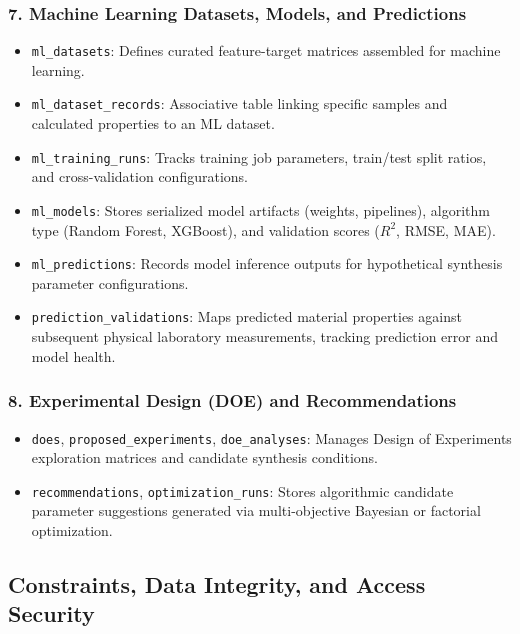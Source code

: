 \documentclass[12pt,a4paper,oneside]{report}
\begin{document}
{{{\subsubsection{7. Machine Learning Datasets, Models, and Predictions}
\begin{itemize}
    \item \texttt{ml\_datasets}: Defines curated feature-target matrices assembled for machine learning.
    \item \texttt{ml\_dataset\_records}: Associative table linking specific samples and calculated properties to an ML dataset.
    \item \texttt{ml\_training\_runs}: Tracks training job parameters, train/test split ratios, and cross-validation configurations.
    \item \texttt{ml\_models}: Stores serialized model artifacts (weights, pipelines), algorithm type (Random Forest, XGBoost), and validation scores ($R^2$, RMSE, MAE).
    \item \texttt{ml\_predictions}: Records model inference outputs for hypothetical synthesis parameter configurations.
    \item \texttt{prediction\_validations}: Maps predicted material properties against subsequent physical laboratory measurements, tracking prediction error and model health.
\end{itemize}

\subsubsection{8. Experimental Design (DOE) and Recommendations}
\begin{itemize}
    \item \texttt{does}, \texttt{proposed\_experiments}, \texttt{doe\_analyses}: Manages Design of Experiments exploration matrices and candidate synthesis conditions.
    \item \texttt{recommendations}, \texttt{optimization\_runs}: Stores algorithmic candidate parameter suggestions generated via multi-objective Bayesian or factorial optimization.
\end{itemize}

\subsection{Constraints, Data Integrity, and Access Security}

}}}
\end{document}
